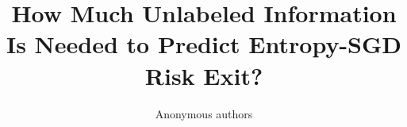 \documentclass[10pt,twocolumn,letterpaper]{article}
\title{How Much Unlabeled Information Is Needed to Predict Entropy-SGD Risk Exit?}
\author{Anonymous authors}
\begin{document}
\maketitle







{\small}
\end{document}
